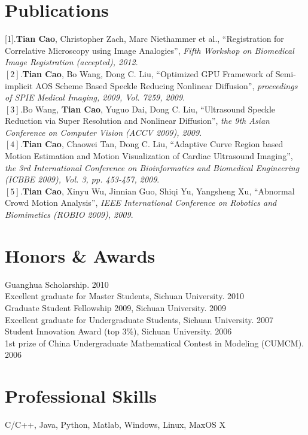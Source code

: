\documentclass[line,margin]{res}
\begin{document}
\begin{resume}
\section{\sc Publications}  

[1].\textbf{Tian Cao}, Christopher Zach, Marc Niethammer et al., ``Registration for Correlative Microscopy using Image Analogies'',  \emph{Fifth Workshop on Biomedical Image Registration (accepted), 2012}.\vspace{.05in}\\%
$[2]$.\textbf{Tian Cao}, Bo Wang, Dong C. Liu, ``Optimized GPU Framework of Semi-implicit AOS
Scheme Based Speckle Reducing Nonlinear Diﬀusion'',  \emph{proceedings of SPIE Medical Imaging, 2009, Vol. 7259, 2009}.\vspace{.05in}\\%
$[3]$.Bo Wang, \textbf{Tian Cao}, Yuguo Dai, Dong C. Liu, ``Ultrasound Speckle Reduction via Super Resolution and Nonlinear Diffusion'',  \emph{the 9th Asian Conference on Computer Vision (ACCV 2009), 2009}. \vspace{.05in}\\
$[4]$.\textbf{Tian Cao}, Chaowei Tan, Dong C. Liu, ``Adaptive Curve Region based Motion Estimation and Motion Visualization of Cardiac Ultrasound Imaging'',  \emph{the 3rd International Conference on Bioinformatics and Biomedical Engineering (ICBBE 2009), Vol. 3, pp. 453-457, 2009}.\vspace{.05in}\\
$[5]$.\textbf{Tian Cao}, Xinyu Wu, Jinnian Guo, Shiqi Yu, Yangsheng Xu, ``Abnormal Crowd Motion Analysis'', \emph{IEEE International Conference on Robotics and Biomimetics (ROBIO 2009), 2009}.

 
\section{\sc Honors \& Awards}


Guanghua Scholarship.  \hfill       2010\\
Excellent graduate for Master Students, Sichuan University. \hfill       2010\\
Graduate Student Fellowship 2009, Sichuan University.  \hfill       2009\\
Excellent graduate for Undergraduate Students, Sichuan University.  \hfill       2007\\
Student Innovation Award (top 3\%), Sichuan University.  \hfill       2006 \\%
1st prize of China Undergraduate Mathematical Contest in Modeling (CUMCM).  \hfill       2006

\section{\sc Professional Skills}
\smallskip

C/C++, Java, Python, Matlab, Windows, Linux, MaxOS X

\end{resume}

%
%
\end{document}
